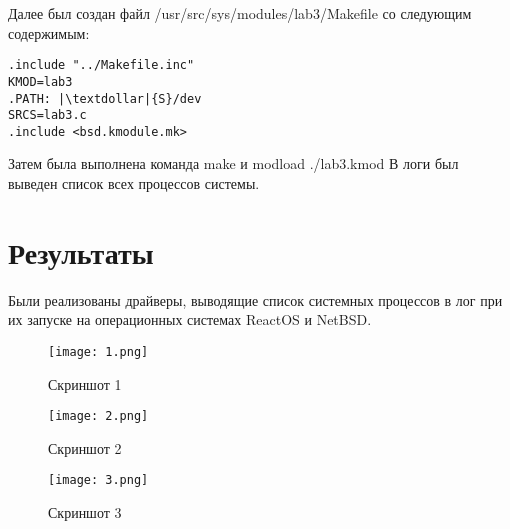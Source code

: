 \documentclass[a4paper, 14pt]{extarticle}
\begin{document}
\begin{flushleft}
Далее был создан файл /usr/src/sys/modules/lab3/Makefile со следующим содержимым:
\end{flushleft}

\begin{verbatim}
.include "../Makefile.inc"
KMOD=lab3
.PATH: |\textdollar|{S}/dev
SRCS=lab3.c
.include <bsd.kmodule.mk>
\end{verbatim}

\begin{flushleft}
Затем была выполнена команда make и modload ./lab3.kmod \newline
В логи был выведен список всех процессов системы.
\end{flushleft}
\pagebreak

\section{Результаты} \label{sec:Results}
\begin{flushleft}
Были реализованы драйверы, выводящие список системных процессов в лог при их запуске на операционных системах ReactOS и NetBSD. 

\begin{figure}[H]

\centering

\texttt{[image: 1.png]}

\caption{Скриншот 1}

\label{fig:mpr}

\end{figure}

\begin{figure}[H]

\centering

\texttt{[image: 2.png]}

\caption{Скриншот 2}

\label{fig:mpr}

\end{figure}

\begin{figure}[H]

\centering

\texttt{[image: 3.png]}

\caption{Скриншот 3}

\label{fig:mpr}

\end{figure}

\end{flushleft}
\pagebreak 
\end{document}
